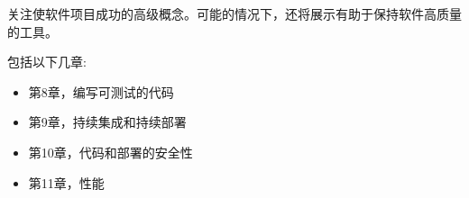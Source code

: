 
关注使软件项目成功的高级概念。可能的情况下，还将展示有助于保持软件高质量的工具。

包括以下几章:

\begin{itemize}
\item 第8章，编写可测试的代码
\item 第9章，持续集成和持续部署
\item 第10章，代码和部署的安全性
\item 第11章，性能 
\end{itemize}